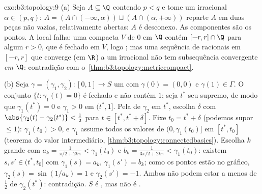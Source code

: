 \begin{solution}{exo:b3:topology:9}
(a) Seja $A \subseteq \Q$ contendo $p < q$ e tome um irracional
$\alpha \in (p, q)$: $A = (A \cap (-\infty, \alpha)) \sqcup
(A\cap(\alpha, +\infty))$ reparte $A$ em duas peças não vazias,
relativamente abertas: $A$ é desconexo. As componentes são os pontos.
A  local falha: uma  compacta $V$ de $0$ em
$\Q$ contém $[-r, r]\cap\Q$ para algum $r > 0$, que é fechado
em $V$, logo ; mas uma sequência de racionais em $[-r,r]$
que converge (em $\R$) a um irracional não tem subsequência
convergente \emph{em $\Q$}: contradição com o~\cref{thm:b3:topology:metriccompact}.

(b) Seja $\gamma = (\gamma_1, \gamma_2) \colon [0,1] \to S$ um
 com $\gamma(0) = (0,0)$ e $\gamma(1) \in \Gamma$. O
conjunto $\{t : \gamma_1(t) = 0\}$ é fechado e não contém
$1$; seja $t^*$ seu supremo, de modo que $\gamma_1(t^*) = 0$ e
$\gamma_1 > 0$ em $(t^*, 1]$. Pela  de $\gamma_2$ em
$t^*$, escolha $\delta$ com $\abs{\gamma_2(t) -
\gamma_2(t^*)} < \tfrac12$ para $t \in [t^*, t^* + \delta]$. Fixe
$t_0 = t^* + \delta$ (podemos supor $\leq 1$): $\gamma_1(t_0) > 0$,
e $\gamma_1$ assume todos os valores de $(0, \gamma_1(t_0)]$ em
$[t^*, t_0]$ (teorema do valor intermediário,
\cref{thm:b3:topology:connectedbasics}). Escolha $k$ grande com
$a_k = \frac1{\pi/2 + 2k\pi} < \gamma_1(t_0)$ e $b_k =
\frac1{3\pi/2 + 2k\pi} < \gamma_1(t_0)$: existem $s, s' \in
(t^*, t_0]$ com $\gamma_1(s) = a_k$, $\gamma_1(s') = b_k$;
como os pontos estão no gráfico, $\gamma_2(s) = \sin(1/a_k) =
1$ e $\gamma_2(s') = -1$. Ambos não podem estar a menos de $\frac12$ de
$\gamma_2(t^*)$: contradição. $S$ é , mas não é
.
\end{solution}


